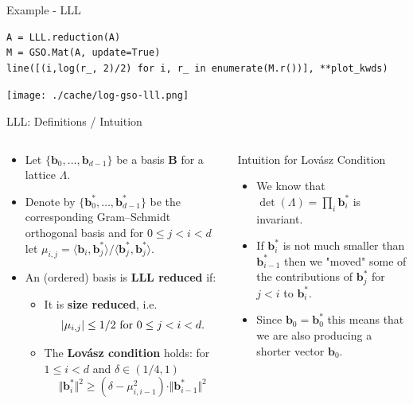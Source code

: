 \documentclass[table,10pt,aspectratio=169]{beamer}
\renewcommand{\vec}[1]{\ensuremath{\mathbf{#1}}\xspace}
\providecommand{\mat}[1]{\ensuremath{\vec{#1}}\xspace}
\begin{document}
\begin{frame}[label={sec:orgcdeb638},fragile]{Example - LLL}
 \lstset{language=Python,label= ,caption= ,captionpos=b,numbers=none}
\begin{lstlisting}
A = LLL.reduction(A)
M = GSO.Mat(A, update=True)
line([(i,log(r_, 2)/2) for i, r_ in enumerate(M.r())], **plot_kwds)
\end{lstlisting}

\begin{center}
\texttt{[image: ./cache/log-gso-lll.png]}
\end{center}
\end{frame}

\begin{frame}[label={sec:org9f92158}]{LLL: Definitions / Intuition}
\begin{columns}
\begin{column}{0.6\columnwidth}
\begin{itemize}
\item Let \(\{\vec{b}_0, \dots, \vec{b}_{d-1} \}\) be a basis \(\mat{B}\) for a lattice \(\Lambda\).
\item Denote by \(\{ \vec{b}_0^*, \dots, \vec{b}_{d-1}^*\}\) be the corresponding Gram--Schmidt orthogonal basis and for \(0 \le j < i < d\) let \(\mu_{i,j} = \langle \vec{b}_i, \vec{b}_j^* \rangle / \langle \vec{b}_j^*, \vec{b}_j^* \rangle.\)
\item An (ordered) basis is \textbf{LLL reduced} if:
\begin{itemize}
\item It is \textbf{size reduced}, i.e. \[| \mu_{i,j} | \le 1/2 \textnormal{ for } 0 \le j < i < d.\]
\item The \textbf{Lovász condition} holds: for \(1 \le i <d\) and \(\delta \in (1/4, 1)\)
\[ \Vert \vec{b}_i^*\Vert^2 \ge \left(\delta - \mu_{i,i-1}^2\right) \cdot \Vert \vec{b}_{i-1}^* \Vert^2 \]
\end{itemize}
\end{itemize}
\end{column}

\begin{column}{0.4\columnwidth}
\begin{block}{Intuition for Lovász Condition}
\begin{itemize}
\item We know that \(\det(\Lambda) = \prod_i \vec{b}_i^*\) is invariant.
\item If \(\vec{b}_i^*\) is not much smaller than \(\vec{b}_{i-1}^*\) then we "moved" some of the contributions of \(\vec{b}_j^*\) for \(j<i\) to \(\vec{b}_i^*\).
\item Since \(\vec{b}_0 = \mathbf{b}_0^*\) this means that we are also producing a shorter vector \(\vec{b}_0\).
\end{itemize}
\end{block}
\end{column}
\end{columns}
\end{frame}
\end{document}
